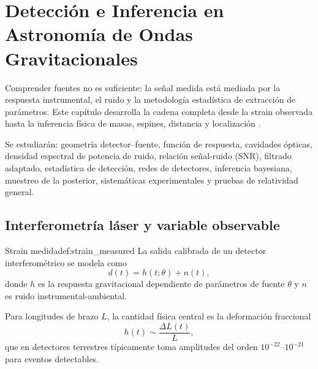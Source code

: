 
\chapter{Detección e Inferencia en Astronomía de Ondas Gravitacionales}
\label{cap:deteccion_inferencia}

Comprender fuentes no es suficiente: la señal medida está mediada por la respuesta instrumental, el ruido y la metodología estadística de extracción de parámetros. Este capítulo desarrolla la cadena completa desde la strain observada hasta la inferencia física de masas, espines, distancia y localización \cite{Creighton2011, Jaranowski2009, Allen2005, LIGO2015, Virgo2015}.

Se estudiarán: geometría detector--fuente, función de respuesta, cavidades ópticas, densidad espectral de potencia de ruido, relación señal-ruido (SNR), filtrado adaptado, estadística de detección, redes de detectores, inferencia bayesiana, muestreo de la posterior, sistemáticas experimentales y pruebas de relatividad general.

\section{Interferometría láser y variable observable}
\label{sec:interferometria_observable}

\begin{definicion}{Strain medida}{def:strain_measured}
La salida calibrada de un detector interferométrico se modela como
\begin{equation}
d(t)=h(t;\theta)+n(t),
\end{equation}
donde $h$ es la respuesta gravitacional dependiente de parámetros de fuente $\theta$ y $n$ es ruido instrumental-ambiental.
\end{definicion}

Para longitudes de brazo $L$, la cantidad física central es la deformación fraccional
\begin{equation}
h(t)\sim\frac{\Delta L(t)}{L},
\end{equation}
que en detectores terrestres típicamente toma amplitudes del orden $10^{-22}$--$10^{-21}$ para eventos detectables.

